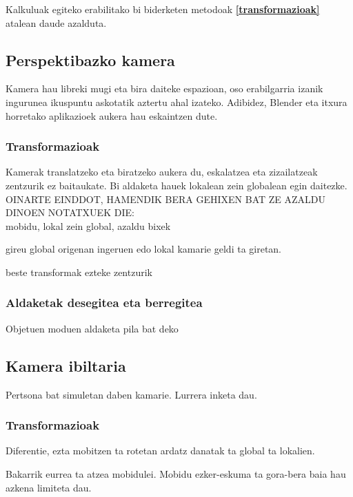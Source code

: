 \documentclass[12pt]{article}
\newcommand{\erref}[1] {\textbf{\ref{#1}}}
\begin{document}
Kalkuluak egiteko erabilitako bi biderketen metodoak \erref{transformazioak} atalean daude azalduta.


\subsection{Perspektibazko kamera}

Kamera hau libreki mugi eta bira daiteke espazioan, oso erabilgarria izanik ingurunea ikuspuntu askotatik aztertu ahal izateko. Adibidez, Blender\cite{blender} eta itxura horretako aplikazioek aukera hau eskaintzen dute.

\subsubsection{Transformazioak}

Kamerak translatzeko eta biratzeko aukera du, eskalatzea eta zizailatzeak zentzurik ez baitaukate. Bi aldaketa hauek lokalean zein globalean egin daitezke.\\

OINARTE EINDDOT, HAMENDIK BERA GEHIXEN BAT ZE AZALDU DINOEN NOTATXUEK DIE:\\

mobidu, lokal zein global, azaldu bixek

gireu global origenan ingeruen edo lokal kamarie geldi ta giretan.

beste transformak ezteke zentzurik

\subsubsection{Aldaketak desegitea eta berregitea}

Objetuen moduen aldaketa pila bat deko

\subsection{Kamera ibiltaria}

Pertsona bat simuletan daben kamarie. Lurrera inketa dau.

\subsubsection{Transformazioak}

Diferentie, ezta mobitzen ta rotetan ardatz danatak ta global ta lokalien.

Bakarrik eurrea ta atzea mobidulei. Mobidu ezker-eskuma ta gora-bera baia hau azkena limiteta dau.
\end{document}
